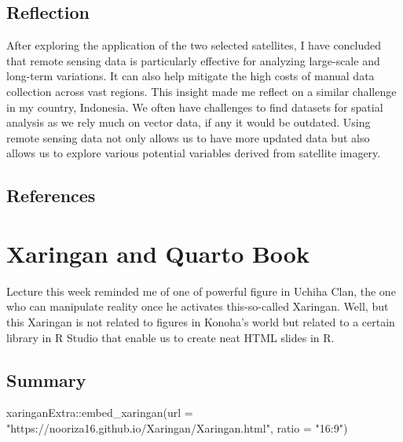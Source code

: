\documentclass[
  letterpaper,
  DIV=11,
  numbers=noendperiod]{scrreprt}
\newenvironment{Shaded}{\begin{snugshade}}{\end{snugshade}}
\newcommand{\AttributeTok}[1]{\textcolor[rgb]{0.40,0.45,0.13}{#1}}
\newcommand{\FunctionTok}[1]{\textcolor[rgb]{0.28,0.35,0.67}{#1}}
\newcommand{\NormalTok}[1]{\textcolor[rgb]{0.00,0.23,0.31}{#1}}
\newcommand{\SpecialCharTok}[1]{\textcolor[rgb]{0.37,0.37,0.37}{#1}}
\newcommand{\StringTok}[1]{\textcolor[rgb]{0.13,0.47,0.30}{#1}}
\begin{document}
\hypertarget{reflection}{%
\section{Reflection}\label{reflection}}

After exploring the application of the two selected satellites, I have
concluded that remote sensing data is particularly effective for
analyzing large-scale and long-term variations. It can also help
mitigate the high costs of manual data collection across vast regions.
This insight made me reflect on a similar challenge in my country,
Indonesia. We often have challenges to find datasets for spatial
analysis as we rely much on vector data, if any it would be outdated.
Using remote sensing data not only allows us to have more updated data
but also allows us to explore various potential variables derived from
satellite imagery.

\hypertarget{references}{%
\section{References}\label{references}}


\hypertarget{xaringan-and-quarto-book}{%
\chapter{Xaringan and Quarto Book}\label{xaringan-and-quarto-book}}

Lecture this week reminded me of one of powerful figure in Uchiha Clan,
the one who can manipulate reality once he activates this-so-called
Xaringan. Well, but this Xaringan is not related to figures in Konoha's
world but related to a certain library in R Studio that enable us to
create neat HTML slides in R.

\hypertarget{summary-1}{%
\section{Summary}\label{summary-1}}

\begin{Shaded}
\begin{Highlighting}[]
\NormalTok{xaringanExtra}\SpecialCharTok{::}\FunctionTok{embed\_xaringan}\NormalTok{(}\AttributeTok{url =} \StringTok{"https://nooriza16.github.io/Xaringan/Xaringan.html"}\NormalTok{, }\AttributeTok{ratio =} \StringTok{"16:9"}\NormalTok{)}
\end{Highlighting}
\end{Shaded}
\end{document}
